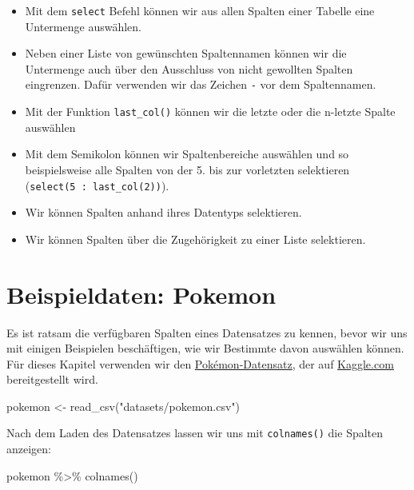 \documentclass[
]{book}
\newenvironment{Shaded}{\begin{snugshade}}{\end{snugshade}}
\newcommand{\FunctionTok}[1]{\textcolor[rgb]{0.00,0.00,0.00}{#1}}
\newcommand{\NormalTok}[1]{#1}
\newcommand{\OtherTok}[1]{\textcolor[rgb]{0.56,0.35,0.01}{#1}}
\newcommand{\SpecialCharTok}[1]{\textcolor[rgb]{0.00,0.00,0.00}{#1}}
\newcommand{\StringTok}[1]{\textcolor[rgb]{0.31,0.60,0.02}{#1}}
\providecommand{\tightlist}{%
  \setlength{\itemsep}{0pt}\setlength{\parskip}{0pt}}
\begin{document}
\begin{itemize}
\tightlist
\item
  Mit dem \texttt{select} Befehl können wir aus allen Spalten einer Tabelle eine Untermenge auswählen.
\item
  Neben einer Liste von gewünschten Spaltennamen können wir die Untermenge auch über den Ausschluss von nicht gewollten Spalten eingrenzen. Dafür verwenden wir das Zeichen \texttt{-} vor dem Spaltennamen.
\item
  Mit der Funktion \texttt{last\_col()} können wir die letzte oder die n-letzte Spalte auswählen
\item
  Mit dem Semikolon können wir Spaltenbereiche auswählen und so beispielsweise alle Spalten von der 5. bis zur vorletzten selektieren (\texttt{select(5\ :\ last\_col(2))}).
\item
  Wir können Spalten anhand ihres Datentyps selektieren.
\item
  Wir können Spalten über die Zugehörigkeit zu einer Liste selektieren.
\end{itemize}

\hypertarget{beispieldaten-pokemon}{%
\section{Beispieldaten: Pokemon}\label{beispieldaten-pokemon}}

Es ist ratsam die verfügbaren Spalten eines Datensatzes zu kennen, bevor wir uns mit einigen Beispielen beschäftigen, wie wir Bestimmte davon auswählen können. Für dieses Kapitel verwenden wir den \href{https://www.kaggle.com/rounakbanik/pokemon/version/1}{Pokémon-Datensatz}, der auf \href{https://kaggle.com/}{Kaggle.com} bereitgestellt wird.

\begin{Shaded}
\begin{Highlighting}[]
\NormalTok{pokemon }\OtherTok{\textless{}{-}} \FunctionTok{read\_csv}\NormalTok{(}\StringTok{"datasets/pokemon.csv"}\NormalTok{)}
\end{Highlighting}
\end{Shaded}

Nach dem Laden des Datensatzes lassen wir uns mit \texttt{colnames()} die Spalten anzeigen:

\begin{Shaded}
\begin{Highlighting}[]
\NormalTok{pokemon }\SpecialCharTok{\%\textgreater{}\%} \FunctionTok{colnames}\NormalTok{()}
\end{Highlighting}
\end{Shaded}
\end{document}
